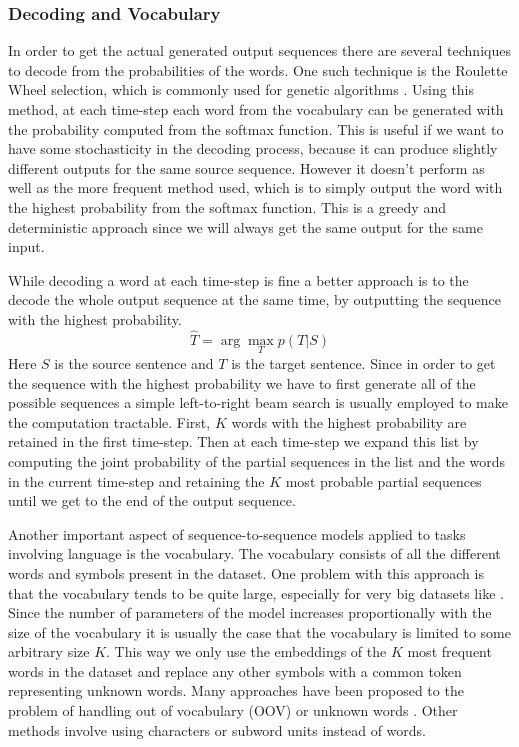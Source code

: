 \documentclass[12pt]{article}
\begin{document}
\subsubsection{Decoding and Vocabulary} \label{sssec:234}
In order to get the actual generated output sequences there are several techniques to decode from the probabilities of the words. One such technique is the Roulette Wheel selection, which is commonly used for genetic algorithms \cite{GA:1998}. Using this method, at each time-step each word from the vocabulary can be generated with the probability computed from the softmax function. This is useful if we want to have some stochasticity in the decoding process, because it can produce slightly different outputs for the same source sequence. However it doesn't perform as well as the more frequent method used, which is to simply output the word with the highest probability from the softmax function. This is a greedy and deterministic approach since we will always get the same output for the same input.

While decoding a word at each time-step is fine a better approach is to the decode the whole output sequence at the same time, by outputting the sequence with the highest probability.
\begin{equation} \label{eq233}
\hat{T}=\arg\max_{T}p(T|S)
\end{equation}
Here \(S\) is the source sentence and \(T\) is the target sentence. Since in order to get the sequence with the highest probability we have to first generate all of the possible sequences a simple left-to-right beam search is usually employed to make the computation tractable. First, \(K\) words with the highest probability are retained in the first time-step. Then at each time-step we expand this list by computing the joint probability of the partial sequences in the list and the words in the current time-step and retaining the \(K\) most probable partial sequences until we get to the end of the output sequence.

Another important aspect of sequence-to-sequence models applied to tasks involving language is the vocabulary. The vocabulary consists of all the different words and symbols present in the dataset. One problem with this approach is that the vocabulary tends to be quite large, especially for very big datasets like \cite{OpenSubtitles:2016,opensubtitles}. Since the number of parameters of the model increases proportionally with the size of the vocabulary it is usually the case that the vocabulary is limited to some arbitrary size \(K\). This way we only use the embeddings of the \(K\) most frequent words in the dataset and replace any other symbols with a common token representing unknown words. Many approaches have been proposed to the problem of handling out of vocabulary (OOV) or unknown words \cite{Luong:2014,Feng:2017,Jean:2014}. Other methods involve using characters \cite{Zhu:2017} or subword units \cite{Sennrich:2015} instead of words.
\end{document}
